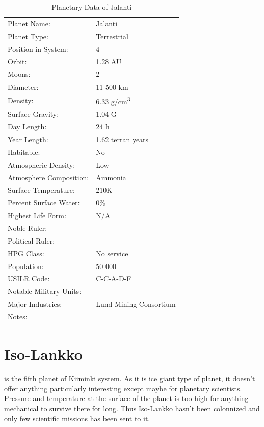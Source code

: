 \documentclass{tufte-book}
\begin{document}
\bigskip
\begin{table}
\begin{minipage}{\textwidth}
\begin{center}
\begin{tabular}{ll}
\toprule
Planet Name: & Jalanti \\
Planet Type: & Terrestrial \\
Position in System: & 4 \\
Orbit: & 1.28 AU \\
Moons: & 2 \\
Diameter: & 11 500 km \\
Density: & 6.33 g/cm\textsuperscript{3} \\
Surface Gravity: & 1.04 G \\
Day Length: & 24 h \\
Year Length: & 1.62 terran years \\
Habitable: & No \\
\quad Atmospheric Density: & Low \\
\quad Atmosphere Composition: & Ammonia \\
\quad Surface Temperature: & 210K \\
\quad Percent Surface Water: & 0\% \\
\quad Highest Life Form: & N/A \\
\toprule
Noble Ruler: & \\
Political Ruler: & \\
HPG Class: & No service \\
Population: & 50 000 \\
USILR Code: & C-C-A-D-F \\
Notable Military Units: & \\
Major Industries: & Lund Mining Consortium  \\
Notes: & \\

\bottomrule
\end{tabular}
\end{center}
\end{minipage}
\caption{Planetary Data of Jalanti}
\end{table}

\section{Iso-Lankko}

 is the fifth planet of Kiiminki system. As it is ice
giant type of planet, it doesn't offer anything particularly interesting
except maybe for planetary scientists. Pressure and temperature at the surface
of the planet is too high for anything mechanical to survive there for long.
Thus Iso-Lankko hasn't been colonnized and only few scientific missions has
been sent to it.
\end{document}
